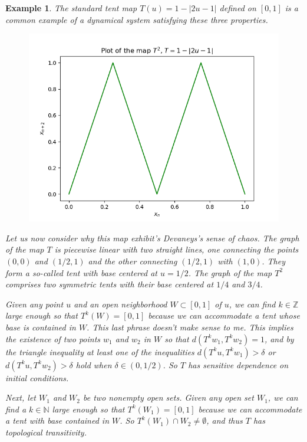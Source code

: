 \documentclass[12 pt]{article}
\newtheorem{Example}{Example}[]
\begin{document}
\begin{Example}
  The standard tent map $T(u)=1-|2u-1|$ defined on $[0,1]$ is a common example of a dynamical system satisfying these three properties. 
  \begin{figure}[ht]
    \includegraphics[scale=0.6]{T2.png}
    \centering
    \label{fig:T2tentmap}
  \end{figure}

  Let us now consider why this map exhibit's Devaneys's sense of chaos. The graph of the map $T$ is piecewise linear with two straight lines, one connecting the points $(0,0)$ and $(1/2,1)$ and the other connecting $(1/2,1)$ with $(1,0)$. They form a so-called tent with base centered at $u=1/2$. The graph of the map $T^2$ comprises two symmetric tents with their base centered at $1/4$ and $3/4$.
  
  Given any point $u$ and an open neighborhood $W \subset[0,1]$ of $u$, we can find $k\in\mathbb{Z}$ large enough so that $T^k(W) = [0,1]$ because we can accommodate a tent whose base is contained in $W$. \emph{This last phrase doesn't make sense to me.} This implies the existence of two points $w_1$ and $w_2$ in $W$ so that $d(T^kw_1,T^kw_2)= 1$, and by the triangle inequality  at least one of the inequalities $d(T^ku,T^kw_1)> \delta$ or $d(T^ku,T^kw_2)> \delta$ hold when $\delta\in (0,1/2)$. \newline So $T$ has sensitive dependence on initial conditions.  
  
  Next, let $W_1$ and $W_2$ be two nonempty open sets. Given any open set $W_1$, we can find a $k\in\mathbb{N}$ large enough so that $T^k(W_1) = [0,1]$ because we can accommodate a tent with base contained in $W$. So $T^k(W_1) \cap W_2 \not=\emptyset$, and thus $T$ has topological transitivity.
  

\end{Example}
\end{document}
